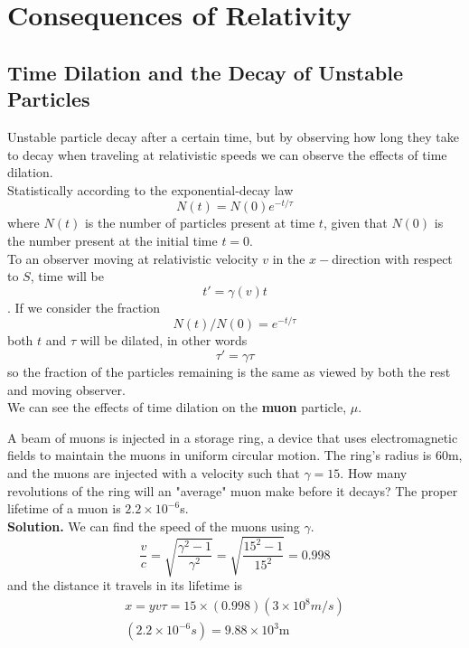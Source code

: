 \chapter{Consequences of Relativity}
\section{Time Dilation and the Decay of Unstable Particles}
Unstable particle decay after a certain time, but by observing how long they take to decay when traveling at relativistic speeds we can observe the effects of time dilation. \\
Statistically according to the exponential-decay law 
\[ N ( t ) = N ( 0 ) e ^ { - t / \tau } \]
where $ N(t) $ is the number of particles present at time $ t $, given that $ N(0) $ is the number present at the initial time $ t = 0 $. \\
To an observer moving at relativistic velocity $ v $ in the $ x- $direction with respect to $ S $, time will be 
\[ t' = \gamma(v) t \]. If we consider the fraction
\[ N ( t ) / N(0) = e^{-t/\tau} \]
both $ t $ and $ \tau $ will be dilated, in other words
\[ \tau' = \gamma \tau \]
so the fraction of the particles remaining is the same as viewed by both the rest and moving observer. \\
We can see the effects of time dilation on the \textbf{muon} particle, $ \mu $. 
\begin{example}
	A beam of muons is injected in a storage ring, a device that uses electromagnetic fields to maintain the muons in uniform circular motion. The ring's radius is $ 60 $m, and the muons are injected with a velocity such that $ \gamma = 15 $. How many revolutions of the ring will an "average" muon make before it decays? The proper lifetime of a muon is $ 2.2 \times 10^{-6} $s. \\
	\textbf{Solution.} We can find the speed of the muons using $ \gamma $.
	\[ \frac { v } { c } = \sqrt { \frac { \gamma ^ { 2 } - 1 } { \gamma ^ { 2 } } } = \sqrt { \frac { 15 ^ { 2 } - 1 } { 15 ^ { 2 } } } = 0.998 \]
	and the distance it travels in its lifetime is 
	\begin{align*}
	x = y v \tau = 15 \times ( 0.998 ) \left( 3 \times 10 ^ { 8 } m / s \right) \\\left( 2.2 \times 10 ^ { - 6 } s \right) = 9.88 \times 10 ^ { 3 } \mathrm { m }
	\end{align*}
\end{example}
